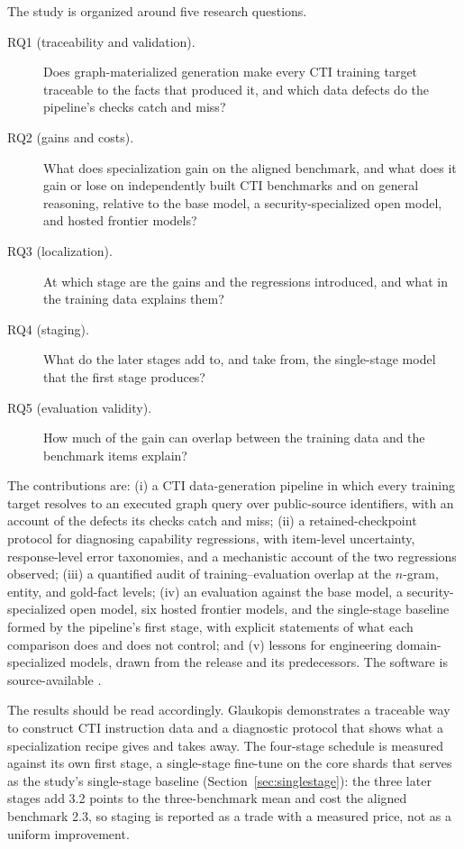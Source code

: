 \documentclass[a4paper,fleqn]{cas-dc}
\begin{document}
The study is organized around five research questions.
\begin{description}
\item[RQ1 (traceability and validation).] Does graph-materialized generation make every CTI training target traceable to the facts that produced it, and which data defects do the pipeline's checks catch and miss?
\item[RQ2 (gains and costs).] What does specialization gain on the aligned benchmark, and what does it gain or lose on independently built CTI benchmarks and on general reasoning, relative to the base model, a security-specialized open model, and hosted frontier models?
\item[RQ3 (localization).] At which stage are the gains and the regressions introduced, and what in the training data explains them?
\item[RQ4 (staging).] What do the later stages add to, and take from, the single-stage model that the first stage produces?
\item[RQ5 (evaluation validity).] How much of the gain can overlap between the training data and the benchmark items explain?
\end{description}

The contributions are: (i) a CTI data-generation pipeline in which every training target resolves to an executed graph query over public-source identifiers, with an account of the defects its checks catch and miss; (ii) a retained-checkpoint protocol for diagnosing capability regressions, with item-level uncertainty, response-level error taxonomies, and a mechanistic account of the two regressions observed; (iii) a quantified audit of training--evaluation overlap at the $n$-gram, entity, and gold-fact levels; (iv) an evaluation against the base model, a security-specialized open model, six hosted frontier models, and the single-stage baseline formed by the pipeline's first stage, with explicit statements of what each comparison does and does not control; and (v) lessons for engineering domain-specialized models, drawn from the release and its predecessors. The software is source-available \citep{glaukopis2026software}.

The results should be read accordingly. Glaukopis demonstrates a traceable way to construct CTI instruction data and a diagnostic protocol that shows what a specialization recipe gives and takes away. The four-stage schedule is measured against its own first stage, a single-stage fine-tune on the core shards that serves as the study's single-stage baseline (Section~\ref{sec:singlestage}): the three later stages add 3.2 points to the three-benchmark mean and cost the aligned benchmark 2.3, so staging is reported as a trade with a measured price, not as a uniform improvement.
\end{document}
